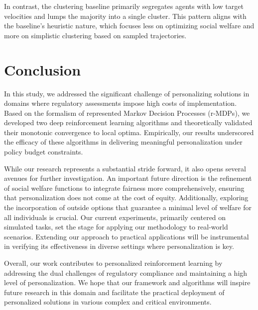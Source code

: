 \documentclass[letterpaper]{article} %
\begin{document}
In contrast, the clustering baseline primarily segregates agents with low target velocities and lumps the majority into a single cluster. This pattern aligns with the baseline's heuristic nature, which focuses less on optimizing social welfare and more on simplistic clustering based on sampled trajectories.


\section{Conclusion}
\label{sec:conclusion}



In this study, we addressed the significant challenge of personalizing solutions in domains where regulatory assessments impose high costs of implementation. Based on the formalism of represented Markov Decision Processes (r-MDPs), we developed two deep reinforcement learning algorithms and theoretically validated their monotonic convergence to local optima. Empirically, our results underscored the efficacy of these algorithms in delivering meaningful personalization under policy budget constraints.

While our research represents a substantial stride forward, it also opens several avenues for further investigation. An important future direction is the refinement of social welfare functions to integrate fairness more comprehensively, ensuring that personalization does not come at the cost of equity. Additionally, exploring the incorporation of outside options that guarantee a minimal level of welfare for all individuals is crucial. Our current experiments, primarily centered on simulated tasks, set the stage for applying our methodology to real-world scenarios. Extending our approach to practical applications will be instrumental in verifying its effectiveness in diverse settings where personalization is key.

Overall, our work contributes to personalized reinforcement learning by addressing the dual challenges of regulatory compliance and maintaining a high level of personalization. We hope that our framework and algorithms will inspire future research in this domain and facilitate the practical deployment of personalized solutions in various complex and critical environments.
\end{document}
